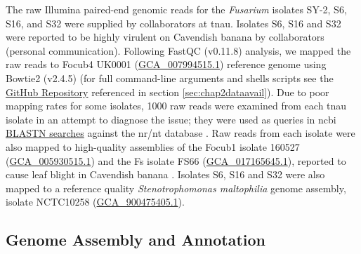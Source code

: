 The raw Illumina paired-end genomic reads for the \textit{Fusarium} isolates SY-2, S6, S16, and S32 were supplied by collaborators at \ac{tnau}. Isolates S6, S16 and S32 were reported to be highly virulent on Cavendish banana by collaborators (personal communication). Following FastQC (v0.11.8)
\parencite{Andrews2010} analysis, we mapped the raw reads to \ac{Focub4} UK0001 (\href{https://www.ncbi.nlm.nih.gov/datasets/genome/GCA_007994515.1/}{GCA\_007994515.1}) \parencite{Warmington2019} reference genome using Bowtie2 (v2.4.5) \parencite{Langmead2012} (for full command-line arguments and shells scripts see the \href{https://github.com/JamiePike/NewTools-Project/blob/master/docs/Assembly/AssemblyNotes.md}{GitHub Repository} referenced in section \ref{sec:chap2dataavail}). Due to poor mapping rates for some isolates, 1000 raw reads were examined from each \ac{tnau} isolate in an attempt to diagnose the issue; they were used as queries in  \ac{ncbi} \href{https://blast.ncbi.nlm.nih.gov/Blast.cgi?PROGRAM=blastn&BLAST_SPEC=GeoBlast&PAGE_TYPE=BlastSearch}{BLASTN searches} against the nr/nt database \parencite{Nih2014}. Raw reads from each isolate were also mapped to high-quality assemblies of the \ac{Focub1} isolate 160527 (\href{https://www.ncbi.nlm.nih.gov/datasets/genome/GCA_005930515.1/}{GCA\_005930515.1}) \parencite{Asai2019} and the \acl{Fs} isolate FS66 (\href{https://www.ncbi.nlm.nih.gov/datasets/genome/GCA_017165645.1/}{GCA\_017165645.1}), reported to cause leaf blight in Cavendish banana \parencite{Cui2021}. Isolates S6, S16 and S32 were also mapped to a reference quality \textit{Stenotrophomonas maltophilia} genome assembly, isolate NCTC10258 (\href{https://www.ncbi.nlm.nih.gov/datasets/genome/GCF_900475405.1/}{GCA\_900475405.1}). 

\subsection{Genome Assembly and Annotation}

